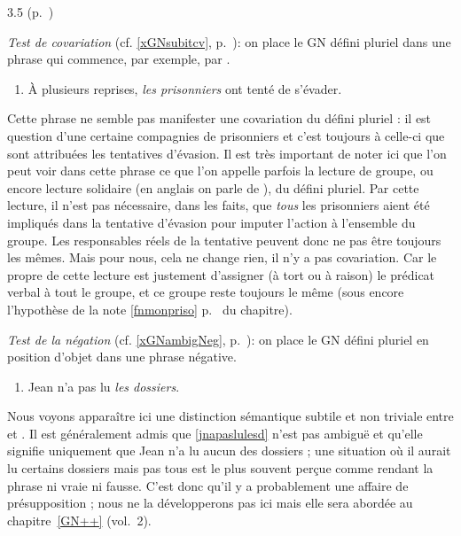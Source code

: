 \begin{Solution}{3.{5}}
 (p.~\pageref{exo:DefPlur})\label{crg:DefPlur}

\noindent\emph{Test de covariation} (cf. \ref{xGNsubitcv}, p.~\pageref{xGNsubitcv}): on place le GN défini pluriel dans une phrase qui commence, par exemple, par .

\begin{enumerate}[label=(\arabic*)]
\item À plusieurs reprises, \emph{les prisonniers} ont tenté de \label{xpriso-f}s'évader.
\end{enumerate}

Cette phrase ne semble pas manifester une covariation du défini pluriel : il est question d'une certaine compagnies de prisonniers et c'est toujours à celle-ci que sont attribuées les tentatives d'évasion.
Il est très important de noter ici que l'on peut voir dans cette phrase ce que l'on appelle parfois la lecture de groupe, ou encore lecture solidaire (en anglais on parle de ), du défini pluriel. Par cette lecture, il n'est pas nécessaire, dans les faits, que \emph{tous} les prisonniers aient été impliqués dans la tentative d'évasion pour imputer l'action à l'ensemble du groupe. Les responsables réels de la tentative peuvent donc ne pas être toujours les mêmes. Mais pour nous, cela ne change rien, il n'y a pas covariation.  Car le propre de cette lecture est justement d'assigner (à tort ou à raison) le prédicat verbal  à tout le groupe, et ce groupe reste toujours le même (sous encore l'hypothèse de la note \ref{fnmonpriso} p.~\pageref{fnmonpriso} du chapitre).

\smallskip

\noindent\emph{Test de la négation} (cf. \ref{xGNambigNeg}, p.~\pageref{xGNambigNeg}): on place le GN défini pluriel en position d'objet dans une phrase négative.

\begin{enumerate}[label=(\arabic*),resume]
\item Jean n'a pas lu \emph{les dossiers}.\label{jnapaslulesd}
\end{enumerate}

Nous voyons apparaître ici une distinction sémantique subtile et non triviale entre  et .
Il est généralement admis que \ref{jnapaslulesd} n'est pas ambiguë et qu'elle signifie uniquement que Jean n'a lu aucun des dossiers ; une situation où il aurait lu certains dossiers mais pas tous est le plus souvent perçue comme rendant la phrase ni vraie ni fausse. C'est donc qu'il y a probablement une affaire de présupposition ; nous ne la développerons pas ici mais elle sera abordée au chapitre~\ref{GN++} (vol.~2).


\end{Solution}
